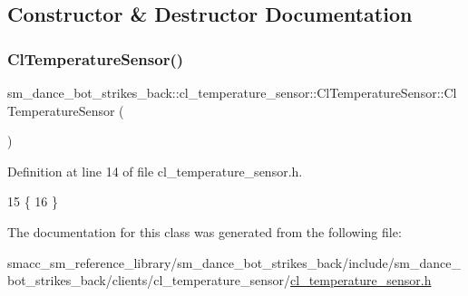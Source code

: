 \subsection{Constructor \& Destructor Documentation}
\mbox{\label{classsm__dance__bot__strikes__back_1_1cl__temperature__sensor_1_1ClTemperatureSensor_ae09d17f596554599b749158b63842df7}} 
\subsubsection{\texorpdfstring{Cl\+Temperature\+Sensor()}{ClTemperatureSensor()}}
{\footnotesize\ttfamily sm\+\_\+dance\+\_\+bot\+\_\+strikes\+\_\+back\+::cl\+\_\+temperature\+\_\+sensor\+::\+Cl\+Temperature\+Sensor\+::\+Cl\+Temperature\+Sensor (\begin{DoxyParamCaption}{ }\end{DoxyParamCaption})\hspace{0.3cm}{\ttfamily [inline]}}



Definition at line 14 of file cl\+\_\+temperature\+\_\+sensor.\+h.


\begin{DoxyCode}
15     \{
16     \}
\end{DoxyCode}


The documentation for this class was generated from the following file\+:\begin{DoxyCompactItemize}
\item 
smacc\+\_\+sm\+\_\+reference\+\_\+library/sm\+\_\+dance\+\_\+bot\+\_\+strikes\+\_\+back/include/sm\+\_\+dance\+\_\+bot\+\_\+strikes\+\_\+back/clients/cl\+\_\+temperature\+\_\+sensor/\hyperlink{sm__dance__bot__strikes__back_2include_2sm__dance__bot__strikes__back_2clients_2cl__temperature_2087b08d03f95f622e49460ceb271c50}{cl\+\_\+temperature\+\_\+sensor.\+h}\end{DoxyCompactItemize}
